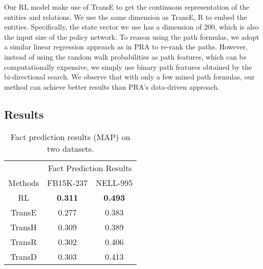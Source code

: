 \documentclass[11pt,letterpaper]{article}
\begin{document}
Our RL model make use of TransE to get the continuous representation of the entities and relations. We use the same dimension as Trans{E, R} to embed the entities. Specifically, the state vector we use has a dimension of 200, which is also the input size of the policy network. To reason using the path formulas, we adopt a similar linear regression approach as in PRA to re-rank the paths. However, instead of using the random walk probabilities as path features, which can be computationally expensive, we simply use binary path features obtained by the bi-directional search. We observe that with only a few mined path formulas, our method can achieve better results than PRA's data-driven approach.
\subsection{Results}

\begin{table}[t]
\centering
\begin{tabular}{cc|c}
\toprule
& \multicolumn{2}{c}{Fact Prediction Results}\\
\cmidrule{2-3}
Methods & FB15K-237 & NELL-995 \\ \midrule
RL & \textbf{0.311} & \textbf{0.493}\\
TransE & 0.277 & 0.383\\
TransH & 0.309 & 0.389\\
TransR & 0.302 & 0.406\\
TransD & 0.303 & 0.413\\
\bottomrule
\end{tabular}
\caption{Fact prediction results (MAP) on two datasets.}
\label{result2}
\end{table}
\end{document}
